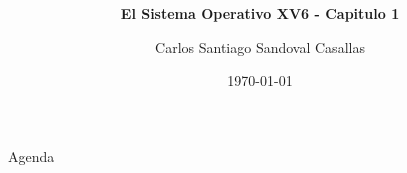 \documentclass{libs/ufc_format}
\title[Sistemas Operativos]{\huge\textbf{}}
\subtitle{\textbf{El Sistema Operativo XV6 - Capitulo 1}}
\author{Carlos Santiago Sandoval Casallas}
\institute[UNAL]{
  \normalsize{\email{csandovalc@unal.edu.co}}
  \newline
  \department{Departamento de Ingeniería de Sistemas e Industrial}
  \newline
  \ufc
}
\date{\today}
\begin{document}


\begin{frame}{}
  \maketitle
\end{frame}

\begin{frame}{Agenda}
  \tableofcontents
\end{frame}
\end{document}
